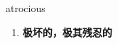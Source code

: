 
\begin{frame}
{\huge atrocious}
\begin{center}
\begin{enumerate}\Large
  \item \textbf{极坏的，极其残忍的}
\end{enumerate}
\end{center}
\end{frame}
